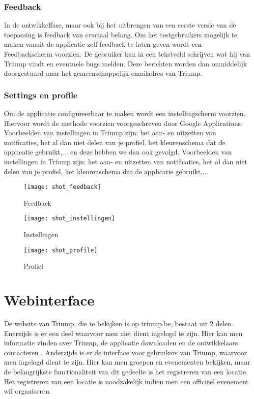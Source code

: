 \subsubsection{Feedback}%
In de ontwikkelfase, maar ook bij het uitbrengen van een eerste versie van de toepassing is feedback van cruciaal belang. Om het testgebruikers mogelijk te maken vanuit de applicatie zelf feedback te laten geven wordt een Feedbackscherm voorzien. De gebruiker kan in een tekstveld schrijven wat hij van Triump vindt en eventuele bugs melden. Deze berichten worden dan onmiddelijk doorgestuurd naar het gemeenschappelijk emailadres van Triump.
\subsubsection{Settings en profile}%
Om de applicatie configureerbaar te maken wordt een instellingscherm voorzien. Hiervoor wordt de methode voorzien voorgeschreven door Google Applications.
Voorbeelden van instellingen in Triump zijn: het aan- en uitzetten van notificaties, het al dan niet delen van je profiel, het kleurenschema dat de applicatie gebruikt,...
en deze hebben we dan ook gevolgd. Voorbeelden van instellingen in Triump zijn: het aan- en uitzetten van notificaties, het al dan niet delen van je profiel, het kleurenschema dat de applicatie gebruikt,...

\begin{figure}[ht]

\begin{minipage}[b]{0.25\linewidth}
\centering
\texttt{[image: shot\_feedback]}
\caption{Feedback}
\label{fig:shot_feedback}
\end{minipage}
\hspace{1.5cm}
\begin{minipage}[b]{0.25\linewidth}
\centering
\texttt{[image: shot\_instellingen]}
\caption{Instellingen}
\label{fig:shot_instellingen}
\end{minipage}
\hspace{1.5cm}
\begin{minipage}[b]{0.25\linewidth}
\centering
\texttt{[image: shot\_profile]}
\caption{Profiel}
\label{fig:shot_profile}
\end{minipage}
\end{figure}

\section{Webinterface}%
De website van Triump, die te bekijken is op triump.be, bestaat uit 2 delen. Enerzijds is er een deel waarvoor men niet dient ingelogd te zijn. Hier kan men informatie vinden over Triump, de applicatie downloaden en de ontwikkelaars contacteren . Anderzijds is er de interface voor gebruikers van Triump, waarvoor men ingelogd dient te zijn. Hier kan men groepen en evenementen bekijken, maar de belangrijkste functionaliteit van dit gedeelte is het registreren van een locatie.
Het registreren van een locatie is noodzakelijk indien men een officiëel evenement wil organiseren.
